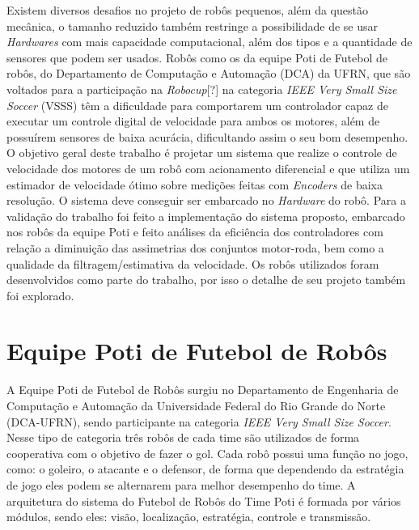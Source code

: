 Existem diversos desafios no projeto de robôs pequenos, além da questão mecânica, o tamanho reduzido também restringe a possibilidade de se usar \emph{Hardwares} com mais capacidade computacional, além dos tipos e a quantidade de sensores que podem ser usados. Robôs como os da equipe Poti de Futebol de robôs, do Departamento de Computação e Automação (DCA) da UFRN, que são voltados para a participação na \emph{Robocup}[?] na categoria \emph{IEEE Very Small Size Soccer} (VSSS) têm a dificuldade para comportarem um controlador capaz de executar um controle digital de velocidade para ambos os motores, além de possuírem sensores de baixa acurácia, dificultando assim o seu bom desempenho.\\

O objetivo geral deste trabalho é projetar um sistema que realize o controle de velocidade dos motores de um robô com acionamento diferencial e que utiliza um estimador de velocidade ótimo sobre medições feitas com \emph{Encoders} de baixa resolução. O sistema deve conseguir ser embarcado no \emph{Hardware} do robô. Para a validação do trabalho foi feito a implementação do sistema proposto, embarcado nos robôs da equipe Poti e feito análises da eficiência dos controladores com relação a diminuição das assimetrias dos conjuntos motor-roda, bem como a qualidade da filtragem/estimativa da velocidade. Os robôs utilizados foram desenvolvidos como parte do trabalho, por isso o detalhe de seu projeto também foi explorado.

\section{Equipe Poti de Futebol de Robôs}
\label{sec:Equipe_Poti}

A Equipe Poti de Futebol de Robôs surgiu no Departamento de Engenharia de Computação e Automação da Universidade Federal do Rio Grande do Norte (DCA-UFRN), sendo participante na categoria \emph{IEEE Very Small Size Soccer}.\\

Nesse tipo de categoria três robôs de cada time são utilizados de forma cooperativa com o objetivo de fazer o gol. Cada robô possui uma função no jogo, como: o goleiro, o atacante e o defensor, de forma que dependendo da estratégia de jogo eles podem se alternarem para melhor desempenho do time. A arquitetura do sistema do Futebol de Robôs do Time Poti é formada por vários módulos, sendo eles: visão, localização, estratégia, controle e transmissão.\\


